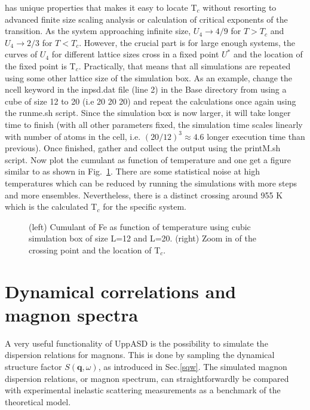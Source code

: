 \documentclass[11pt,fleqn,a4]{book} %
\begin{document}
has unique properties that makes it easy to locate T$_c$ without resorting to advanced finite size scaling analysis or calculation of critical exponents of the transition. As the system approaching infinite size, $U_4 \to 4/9$ for $T> T_c$ and $U_4 \to 2/3$ for $T< T_c$. However, the crucial part is for large enough systems, the curves of $U_4$ for different lattice sizes cross in a fixed point $U^*$ and the location of the fixed point is T$_c$. Practically, that means that all simulations are repeated using some other lattice size of the simulation box. As an example, change the ncell keyword in the inpsd.dat file (line 2) in the Base directory from using a cube of size 12 to 20 (i.e 20 20 20) and repeat the calculations once again using the runme.sh script. Since the simulation box is now larger, it will take longer time to finish (with all other parameters fixed, the simulation time scales linearly with number of atoms in the cell, i.e. $(20/12)^3 \approx 4.6$ longer execution time than previous). Once finished, gather and collect the output using the printM.sh script. Now plot the cumulant as function of temperature and one get a figure similar to as shown in Fig.~\ref{fig:MTFe}. There are some statistical noise at high temperatures which can be reduced by running the simulations with more steps and more ensembles. Nevertheless, there is a distinct crossing around 955 K which is the calculated T$_c$ for the specific system.

\begin{figure}[h!]
\caption{(left) Cumulant of Fe as function of temperature using cubic simulation box of size L=12 and L=20.  (right) Zoom in of the crossing point and the location of T$_c$.}
\label{fig:MTFe}
\end{figure}

\section{Dynamical correlations and magnon spectra}
A very useful functionality of UppASD is the possibility to simulate the dispersion relations for magnons. This is done by sampling the dynamical structure factor $S(\mathbf{q},\omega)$, as introduced in Sec.\ref{sqw}. The simulated magnon dispersion relations, or magnon spectrum, can straightforwardly be compared with experimental inelastic scattering measurements as a benchmark of the theoretical model. 
%
\end{document}
